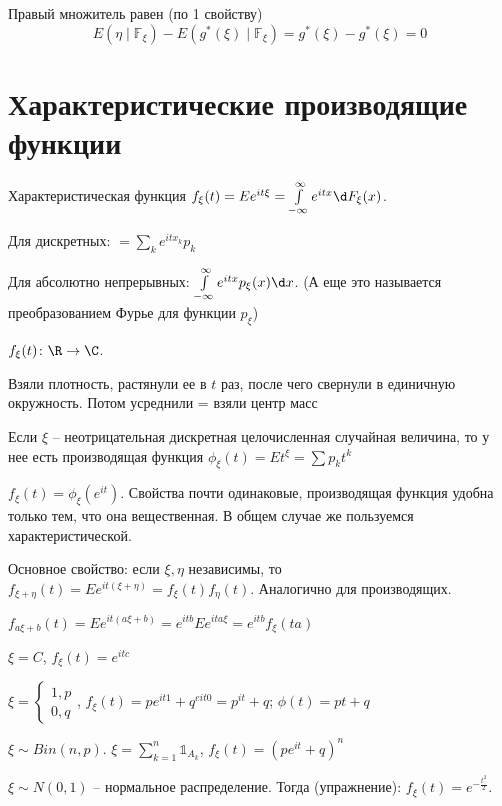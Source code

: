 Правый множитель равен (по 1 свойству) 
$$E(\eta \mid \mathbb{F}_\xi) - E(g^*(\xi) \mid \mathbb{F}_\xi) = g^*(\xi) - g^*(\xi) = 0$$

\section{Характеристические производящие функции}
\begin{Def}
Характеристическая функция $f_\xi(t) = E e^{it\xi} = \int\limits_{-\infty}^\infty e^{itx} \d F_\xi(x)$.

Для дискретных: $ = \sum\limits_k e^{itx_k} p_k$

Для абсолютно непрерывных: $\int\limits_{-\infty}^\infty e^{itx}p_\xi(x) \d x$. (А еще это называется преобразованием Фурье для функции $p_\xi$)

$f_\xi(t) \colon \R \to \C$.
\end{Def}
\begin{Rem}
Взяли плотность, растянули ее в $t$ раз, после чего свернули в единичную окружность. Потом усреднили = взяли центр масс
\end{Rem}

\begin{Def}
Если $\xi$ -- неотрицательная дискретная целочисленная случайная величина, то у нее есть производящая функция $\phi_\xi(t) = Et^\xi = \sum p_k t^k$
\end{Def}
\begin{Rem}
$f_\xi(t) = \phi_\xi(e^{it})$. Свойства почти одинаковые, производящая функция удобна только тем, что она вещественная. В общем случае же пользуемся характеристической.
\end{Rem}

Основное свойство: если $\xi, \eta$ независимы, то $f_{\xi + \eta}(t) = Ee^{it(\xi + \eta)} = f_\xi(t)f_\eta(t)$. 
Аналогично для производящих.

$f_{a\xi + b}(t) = E e^{it(a\xi + b)} = e^{itb} Ee^{ita\xi} = e^{itb} f_\xi(ta)$

\begin{exmp}
$\xi = C$, $f_\xi(t) = e^{itc}$
\end{exmp}
\begin{exmp}
$\xi = \begin{cases}1, p \\0, q\end{cases}$, $f_\xi(t) = pe^{it1} + q^{eit0} = p^{it} + q$; $\phi(t) = pt + q$
\end{exmp}
\begin{exmp}
$\xi \sim Bin(n, p)$. $\xi = \sum\limits_{k=1}^n \mathbb{1}_{A_k}$, $f_\xi(t) = (pe^{it} + q)^n$
\end{exmp}
$\xi \sim N(0, 1)$ -- нормальное распределение. Тогда (упражнение): $f_\xi(t) = e^{-\frac{t^2}{2}}$.

